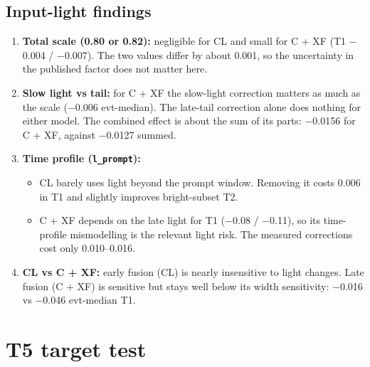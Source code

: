 \documentclass[10pt,a4paper]{article}
\begin{document}
\subsection{Input-light findings}
\begin{enumerate}
\item \textbf{Total scale (0.80 or 0.82):} negligible for CL and small for C + XF (T1 $-$0.004 / $-$0.007). The two values differ by about 0.001, so the uncertainty in the published factor does not matter here.
\item \textbf{Slow light vs tail:} for C + XF the slow-light correction matters as much as the scale ($-$0.006 evt-median). The late-tail correction alone does nothing for either model. The combined effect is about the sum of its parts: $-$0.0156 for C + XF, against $-$0.0127 summed.
\item \textbf{Time profile (\texttt{l\_\allowbreak{}prompt}):}
\begin{itemize}
\item CL barely uses light beyond the prompt window. Removing it costs 0.006 in T1 and slightly improves bright-subset T2.
\item C + XF depends on the late light for T1 ($-$0.08 / $-$0.11), so its time-profile mismodelling is the relevant light risk. The measured corrections cost only 0.010--0.016.
\end{itemize}
\item \textbf{CL vs C + XF:} early fusion (CL) is nearly insensitive to light changes. Late fusion (C + XF) is sensitive but stays well below its width sensitivity: $-$0.016 vs $-$0.046 evt-median T1.
\end{enumerate}
\section{T5 target test}
\end{document}
